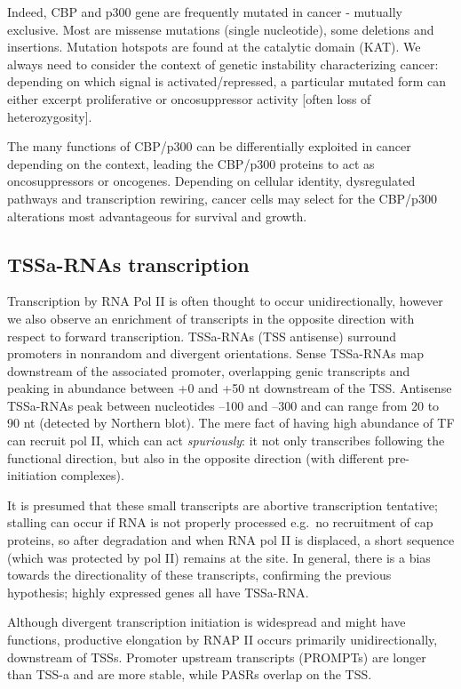 Indeed, CBP and p300 gene are frequently mutated in cancer - mutually exclusive. Most are missense mutations (single nucleotide), some deletions and insertions. Mutation hotspots are found at the catalytic domain (KAT). We always need to consider the context of genetic instability characterizing cancer: depending on which signal is activated/repressed, a particular mutated form can either excerpt proliferative or oncosuppressor activity {[}often loss of heterozygosity{]}.

The many functions of CBP/p300 can be differentially exploited in cancer depending on the context, leading the CBP/p300 proteins to act as oncosuppressors or oncogenes. Depending on cellular identity, dysregulated pathways and transcription rewiring, cancer cells may select for the CBP/p300 alterations most advantageous for survival and growth.

\hypertarget{tssa-rnas-transcription}{%
\subsection{\texorpdfstring{\textbf{TSSa-RNAs transcription}}{TSSa-RNAs transcription}}\label{tssa-rnas-transcription}}

Transcription by RNA Pol II is often thought to occur unidirectionally, however we also observe an enrichment of transcripts in the opposite direction with respect to forward transcription. TSSa-RNAs (TSS antisense) surround promoters in nonrandom and divergent orientations. Sense TSSa-RNAs map downstream of the associated promoter, overlapping genic transcripts and peaking in abundance between +0 and +50 nt downstream of the TSS. Antisense TSSa-RNAs peak between nucleotides --100 and --300 and can range from 20 to 90 nt (detected by Northern blot). The mere fact of having high abundance of TF can recruit pol II, which can act \emph{spuriously}: it not only transcribes following the functional direction, but also in the opposite direction (with different pre-initiation complexes).

It is presumed that these small transcripts are abortive transcription tentative; stalling can occur if RNA is not properly processed e.g.~no recruitment of cap proteins, so after degradation and when RNA pol II is displaced, a short sequence (which was protected by pol II) remains at the site. In general, there is a bias towards the directionality of these transcripts, confirming the previous hypothesis; highly expressed genes all have TSSa-RNA.

Although divergent transcription initiation is widespread and might have functions, productive elongation by RNAP II occurs primarily unidirectionally, downstream of TSSs. Promoter upstream transcripts (PROMPTs) are longer than TSS-a and are more stable, while PASRs overlap on the TSS.

